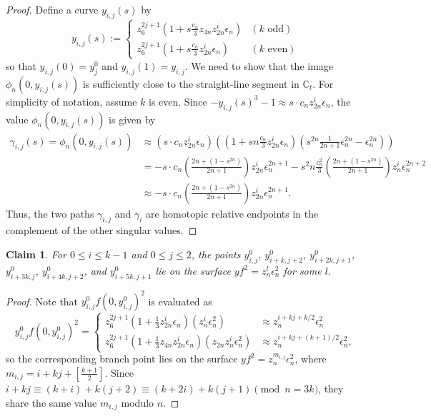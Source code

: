 \documentclass[10pt,a4paper,reqno]{amsart}
\newtheorem{claim}[thm]{Claim}
\theoremstyle{definition}
\numberwithin{equation}{section}
\numberwithin{figure}{section}
\newcommand{\C}{\mathbb{C}}
\newcommand{\ep}{\epsilon}
\begin{document}
\begin{proof}
Define a curve $y_{i,j}(s)$ by
\[y_{i,j}(s):=
\begin{cases} z_{6}^{2j+1}(1+ s \frac{c_n}{3}z_{4n}z_{2n}^i {\ep_n}) & (k \text{ odd}) \\
z_{6}^{2j+1}(1+ s \frac{c_n}{3} z_{2n}^i {\ep_n}) & (k \text{ even}) 
\end{cases}\]
so that $y_{i,j}(0)=y_j^0$ and $y_{i,j}(1)=y_{i,j}$.
We need to show that the image $\phi_n(0,y_{i,j}(s))$ is sufficiently close to the straight-line segment in $\C_t$.
For simplicity of notation, assume $k$ is even.
Since $-y_{i,j}(s)^3-1 \approx s \cdot c_n z_{2n}^i {\ep_n}$,
the value $\phi_n(0,y_{i,j}(s))$ is given by
\begin{align*}
\gamma_{i,j}(s)=\phi_n(0,y_{i,j}(s))
&\approx (s\cdot c_n z_{2n}^i {\ep_n}) \left( (1+s n \frac{c_n}{3} z_{2n}^i {\ep_n}) (s^{2n} \frac{1}{2n+1}{\ep_n^{2n}}-{\ep_n^{2n}})\right) \\
&=-s\cdot c_n  \left(  \frac{2n+(1-s^{2n})}{2n+1}\right)z_{2n}^i {\ep_n^{2n+1}}-s^2 n \frac{c_n^2}{3} \left(\frac{2n+(1-s^{2n})}{2n+1}\right) z_n^i {\ep_n^{2n+2}}\\
&\approx -s\cdot c_n  \left(  \frac{2n+(1-s^{2n})}{2n+1}\right)z_{2n}^i {\ep_n^{2n+1}}.
\end{align*}
Thus, the two paths $\gamma_{i,j}$ and ${{\gamma}}_{i}$ are homotopic relative endpoints in the complement of the other singular values.
\end{proof}

\begin{claim} \label{claim:subsurface}
For $0\le i \le k-1$ and $0 \le j \le 2$, 
the points $y^0_{i,j}$, $y^0_{i+k,j+2}$, $y^0_{i+2k,j+1}$, $y^0_{i+3k,j}$, $y^0_{i+4k,j+2}$, and $y^0_{i+5k,j+1}$
lie on the surface $yf^2=z_{n}^l \ep_n^2$ for some $l$.
\end{claim}

\begin{proof}
Note that $y_{i,j}^0 f(0,y_{i,j}^0)^2$ is evaluated as
\[y_{i,j}^0 f(0,y_{i,j}^0)^2 =\begin{cases} z_6^{2j+1}(1+ \frac{1}{3} z_{2n}^i {\ep_n})(z_n^i {\ep_n^{2}}) &\approx z_{n}^{i+kj+k/2} {\ep_n^{2}}\\
 z_6^{2j+1}(1+ \frac{1}{3} z_{4n}z_{2n}^i {\ep_n})(z_{2n}z_n^i {\ep_n^{2}}) &\approx z_{n}^{i+kj+(k+1)/2} {\ep_n^{2}}, \end{cases}\]
so the corresponding branch point lies on the surface $yf^2=z_n^{m_{i,j}} {\ep_n^{2}}$, where $m_{i,j}=i+kj+\left[  \frac{k+1}{2} \right]$.
Since $i+kj \equiv (k+i)+k(j+2) \equiv (k+2i)+k(j+1) \pmod{n=3k}$, they share the same value $m_{i,j}$ modulo $n$.
\end{proof}
\end{document}
